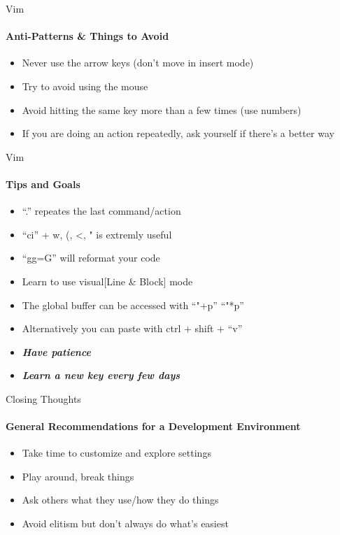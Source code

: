 \documentclass{beamer}
\begin{document}
\begin{frame}{Vim}
  \framesubtitle{Anti-Patterns \& Things to Avoid}

  \begin{itemize}\setlength\itemsep{1em}
    \item Never use the arrow keys (don't move in insert mode)
    \item Try to avoid using the mouse
    \item Avoid hitting the same key more than a few times (use numbers)
    \item If you are doing an action repeatedly, ask yourself if there's a better way
  \end{itemize}

\end{frame}


\begin{frame}{Vim}
  \framesubtitle{Tips and Goals}

  \begin{itemize}\setlength\itemsep{1em}
    \item ``.'' repeates the last command/action
    \item ``ci'' + {w, (, <, "} is extremly useful
    \item ``gg=G'' will reformat your code
    \item Learn to use visual[Line \& Block] mode
    \item The global buffer can be accessed with ``"+p'' ``"*p''
    \item Alternatively you can paste with ctrl + shift + ``v''

    \item \emph{\textbf{\Large Have patience}}
    \item \emph{\textbf{\Large Learn a new key every few days}}
  \end{itemize}

\end{frame}


\begin{frame}{Closing Thoughts}
  \framesubtitle{General Recommendations for a Development Environment}

  \begin{itemize}\setlength\itemsep{1em}
    \item Take time to customize and explore settings
    \item Play around, break things
    \item Ask others what they use/how they do things
    \item Avoid elitism but don't always do what's easiest
  \end{itemize}

\end{frame}
\end{document}
